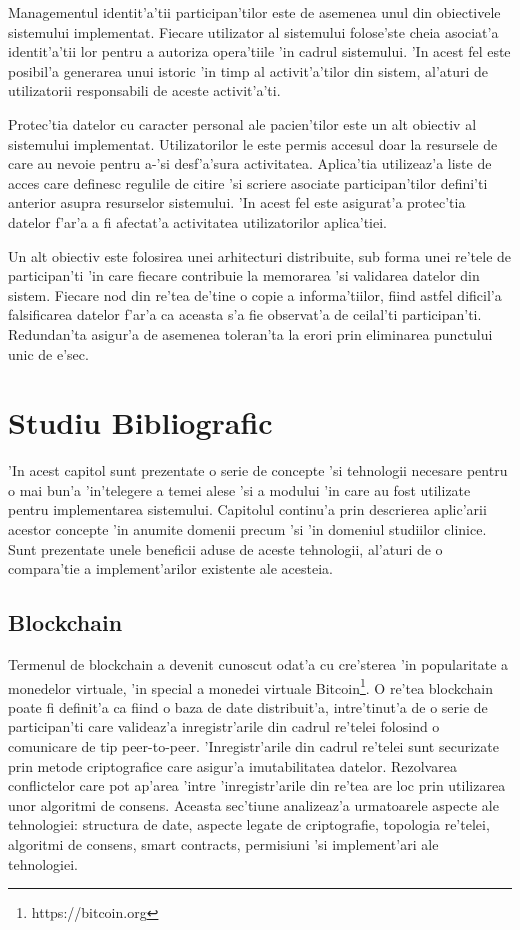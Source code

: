 \documentclass[12pt,a4paper,twoside]{report}
\begin{document}
    Managementul identit'a'tii participan'tilor este de asemenea unul din obiectivele sistemului implementat. Fiecare utilizator al sistemului folose'ste cheia asociat'a identit'a'tii lor pentru a autoriza opera'tiile 'in cadrul sistemului. 'In acest fel este posibil'a generarea unui istoric 'in timp al activit'a'tilor din sistem, al'aturi de utilizatorii responsabili de aceste activit'a'ti.
    
    Protec'tia datelor cu caracter personal ale pacien'tilor este un alt obiectiv al sistemului implementat. Utilizatorilor le este permis accesul doar la resursele de care au nevoie pentru a-'si desf'a'sura activitatea. Aplica'tia utilizeaz'a liste de acces care definesc regulile de citire 'si scriere asociate participan'tilor defini'ti anterior asupra resurselor sistemului. 'In acest fel este asigurat'a protec'tia datelor f'ar'a a fi afectat'a activitatea utilizatorilor aplica'tiei.
    
    Un alt obiectiv este folosirea unei arhitecturi distribuite, sub forma unei re'tele de participan'ti 'in care fiecare contribuie la memorarea 'si validarea datelor din sistem. Fiecare nod din re'tea de'tine o copie a informa'tiilor, fiind astfel dificil'a falsificarea datelor f'ar'a ca aceasta s'a fie observat'a de ceilal'ti participan'ti. Redundan'ta asigur'a de asemenea toleran'ta la erori prin eliminarea punctului unic de e'sec.
    
    
    




\chapter{Studiu Bibliografic}
	'In acest capitol sunt prezentate o serie de concepte 'si tehnologii necesare pentru o mai bun'a 'in'telegere a temei alese 'si a modului 'in care au fost utilizate pentru implementarea sistemului. Capitolul continu'a prin descrierea aplic'arii acestor concepte 'in anumite domenii precum 'si 'in domeniul studiilor clinice. Sunt prezentate unele beneficii aduse de aceste tehnologii, al'aturi de o compara'tie a implement'arilor existente ale acesteia.
	\section{Blockchain}	
	Termenul de blockchain a devenit cunoscut odat'a cu cre'sterea 'in popularitate a monedelor virtuale, 'in special a monedei virtuale Bitcoin\footnote{https://bitcoin.org}. O re'tea blockchain poate fi definit'a ca fiind o baza de date distribuit'a, intre'tinut'a de o serie de participan'ti care valideaz'a inregistr'arile din cadrul re'telei folosind o comunicare de tip peer-to-peer. 'Inregistr'arile din cadrul re'telei sunt securizate prin metode criptografice care asigur'a imutabilitatea datelor. Rezolvarea conflictelor care pot ap'area 'intre 'inregistr'arile din re'tea are loc prin utilizarea unor algoritmi de consens. Aceasta sec'tiune analizeaz'a urmatoarele aspecte ale tehnologiei: structura de date, aspecte legate de criptografie, topologia re'telei, algoritmi de consens, smart contracts, permisiuni 'si implement'ari ale tehnologiei.
\end{document}
